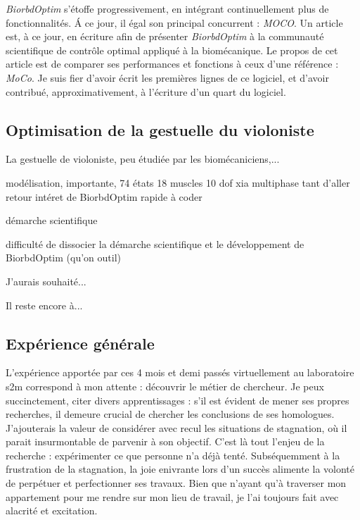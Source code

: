 \emph{BiorbdOptim} s'étoffe progressivement, en intégrant continuellement plus de fonctionnalités. \'A ce jour,  il égal son principal concurrent : \emph{MOCO}. Un article est, à ce jour, en écriture afin de présenter \emph{BiorbdOptim} à la communauté scientifique de contrôle optimal appliqué à la biomécanique. Le propos de cet article est de comparer ses performances et fonctions à ceux d'une référence : \emph{MoCo}.
Je suis fier d'avoir écrit les premières lignes de ce logiciel, et d'avoir contribué, approximativement, à l'écriture d'un quart du logiciel.


    \subsection*{Optimisation de la gestuelle du violoniste}
    
La gestuelle de violoniste, peu étudiée par les biomécaniciens,...

modélisation, importante, 74 états 18 muscles 10 dof
xia
multiphase tant d'aller retour
intéret de BiorbdOptim rapide à coder

démarche scientifique

difficulté de dissocier la démarche scientifique et le développement de BiorbdOptim (qu'on outil)

J'aurais souhaité...

Il reste encore à...

    
    \subsection*{Expérience générale}
    
L'expérience apportée par ces 4 mois et demi passés virtuellement au laboratoire s2m correspond à mon
attente : découvrir le métier de chercheur. Je peux succinctement, citer divers apprentissages : s'il est évident de mener ses propres recherches, il demeure crucial de chercher les conclusions de ses homologues. J'ajouterais la valeur de considérer avec recul les situations de stagnation, où il parait insurmontable de parvenir à son objectif. C'est là tout l'enjeu de la recherche : expérimenter ce que personne n'a déjà tenté.
Subséquemment à la frustration de la stagnation, la joie enivrante lors d'un succès alimente la volonté de perpétuer et perfectionner ses travaux. Bien que n'ayant qu'à traverser mon appartement pour me rendre sur mon lieu de travail, je l'ai toujours fait avec alacrité et excitation.

